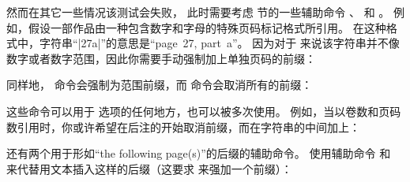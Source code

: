 \begin{ltxexample}
\cite[25]{key}
\cite[vii]{key}
\cite[XIV]{key}
\cite[34--38]{key}
\cite[iv--x]{key}
\cite[185/86]{key}
\cite[XI \& XV]{key}
\cite[3, 5, 7]{key}
\cite[vii--x; 5, 7]{key}
\end{ltxexample}
%
然而在其它一些情况该测试会失败，
此时需要考虑  节的一些辅助命令 、 和 。
例如，假设一部作品由一种包含数字和字母的特殊页码标记格式所引用。
在这种格式中，字符串“|27a|”的意思是“page~27, part~a”。
因为对于 \biblatex 来说该字符串并不像数字或者数字范围，因此你需要手动强制加上单独页码的前缀：

\begin{ltxexample}
\cite[\pno~27a]{key}
\end{ltxexample}
%
同样地， 命令会强制为范围前缀，而  命令会取消所有的前缀：

\begin{ltxexample}
\cite[\ppno~27a--28c]{key}
\cite[]{key}
\end{ltxexample}
%
这些命令可以用于  选项的任何地方，也可以被多次使用。
例如，当以卷数和页码数引用时，你或许希望在后注的开始取消前缀，而在字符串的中间加上：

\begin{ltxexample}
\cite[VII, \pno~5]{key}
\cite[VII, \pno~3, \ppno~40--45]{key}
\cite[see][\ppno~37--46, in particular \pno~40]{key}
\end{ltxexample}
%
还有两个用于形如“the following page(s)”的后缀的辅助命令。
使用辅助命令  和  来代替用文本插入这样的后缀（这要求  来强加一个前缀）：

